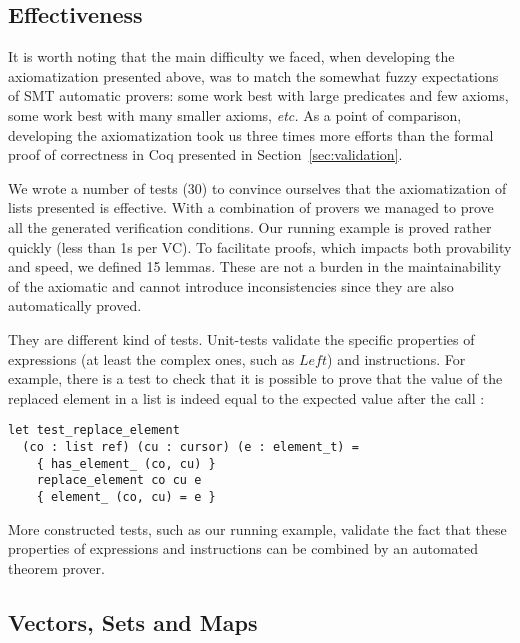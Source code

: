 \documentclass[runningheads,a4paper]{llncs}
\newcommand{\etc}{\textit{etc.}\xspace}
\newcommand{\Left}{\ensuremath{\mathit{Left}}\xspace}
\newcommand{\beforesub}{\vspace{-0.2cm}}
\newcommand{\aftersub}{\vspace{-0.1cm}}
\begin{document}
\beforesub
\subsection{Effectiveness}
\aftersub

It is worth noting that the main difficulty we faced, when developing the
axiomatization presented above, was to match the somewhat fuzzy expectations of
SMT automatic provers: some work best with large predicates and few axioms,
some work best with many smaller axioms, \etc
\ifdefined\longversion
 As a point of comparison,
developing the axiomatization took us three times more efforts than the formal
proof of correctness in Coq presented in Section~\ref{sec:validation}.
\fi

We wrote a number of tests (30) to convince ourselves that the axiomatization
of lists presented is effective. With a combination of provers we managed to
prove all the generated verification conditions. Our running example is proved
rather quickly (less than 1s per VC). To facilitate proofs, which impacts both
provability and speed, we defined 15 lemmas. These are not a burden in the
maintainability of the axiomatic and cannot introduce inconsistencies since
they are also automatically proved.

They are different kind of tests. Unit-tests validate the specific properties
of expressions (at least the complex ones, such as $\Left$) and instructions.
For example, there is a test to check that it is possible to prove that the value
of the replaced element in a list is indeed equal to the expected value after
the call :
\lstset{language=Ada, basicstyle=\small\tt, keywordstyle=\normalfont\textbf}
\begin{lstlisting}
let test_replace_element
  (co : list ref) (cu : cursor) (e : element_t) =
    { has_element_ (co, cu) }
    replace_element co cu e
    { element_ (co, cu) = e }
\end{lstlisting}
More constructed tests, such as our running example, validate the fact that these properties of expressions
and instructions can be combined by an automated theorem prover.

\beforesub
\subsection{Vectors, Sets and Maps}
\aftersub
\end{document}
